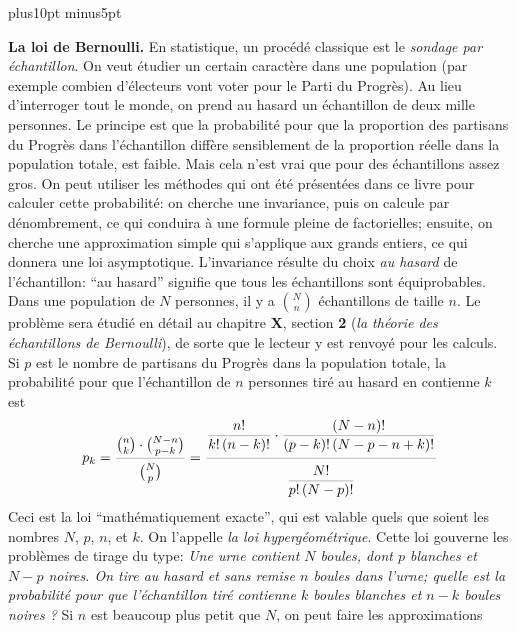 \vskip12pt plus10pt minus5pt
 
{\bf La loi de Bernoulli.} 
\medskip 
En statistique,  un proc\'ed\'e classique est le {\it sondage par  
\'echantillon}.  On veut \'etudier un certain caract\`ere dans une 
population (par exemple combien d'\'electeurs vont voter pour le Parti  
du Progr\`es). Au lieu d'interroger tout le monde, on prend au hasard un 
\'echantillon de deux mille personnes. Le principe est que la probabilit\'e 
pour que la proportion  des partisans du Progr\`es dans l'\'echantillon 
diff\`ere sensiblement de  la proportion r\'eelle dans la population  
totale, est faible. Mais cela  n'est vrai que pour des \'echantillons  
assez gros.   
\medskip 
On peut utiliser les m\'ethodes qui ont \'et\'e  pr\'esent\'ees dans ce 
livre pour calculer cette probabilit\'e: on cherche une invariance, puis on 
calcule par d\'enombrement, ce qui conduira \`a une formule pleine de 
factorielles; ensuite, on cherche une approximation simple qui s'applique 
aux  grands entiers, ce qui donnera une loi asymptotique.  
\medskip 
L'invariance r\'esulte du choix {\it au hasard} de l'\'echantillon: 
``au hasard'' signifie que tous les \'echantillons sont \'equiprobables. 
Dans une population de $N$ personnes, il y a $N \choose n$ \'echantillons
de taille $n$. Le probl\`eme sera \'etudi\'e en d\'etail au chapitre {\bf X},  
section {\bf 2} ({\sl la th\'eorie des \'echantillons de Bernoulli}), 
de sorte que le lecteur y est renvoy\'e pour les calculs.  Si $p$ est
le nombre de partisans du Progr\`es dans la population totale, 
la probabilit\'e pour que l'\'echantillon de $n$ personnes tir\'e
au hasard en contienne $k$ est  
$$p_k = { \vrule height0pt depth6pt width0pt {n \choose k} \cdot  {N-n  
\choose p-k}  \over \vrule height12pt depth0pt width0pt  {N \choose p} }  
= {\vrule height0pt depth13pt width0pt {\displaystyle {n!  
\over k! \,  (n-k)!} \cdot {(N-n)! \over (p-k)! \, (N-p-n+k)!}} \over  \vrule 
height18pt depth0pt width0pt{\displaystyle {N! \over p! \, (N-p)!}} } $$  
Ceci est la loi ``math\'ematiquement exacte'', qui est valable quels que 
soient les nombres $N$, $p$, $n$, et $k$. On l'appelle {\it la loi 
hyperg\'eom\'etrique}. 
\medskip 
Cette loi gouverne les probl\`emes de tirage du type: {\sl Une urne  
contient $N$ boules, dont $p$ blanches et $N-p$ noires. On tire au   
hasard  et sans remise $n$ boules dans l'urne; quelle est la probabilit\'e 
pour que l'\'echantillon tir\'e contienne $k$ boules blanches et $n-k$  
boules noires ?} 
\medskip 
Si $n$ est beaucoup plus petit que $N$, on peut faire les approximations 
